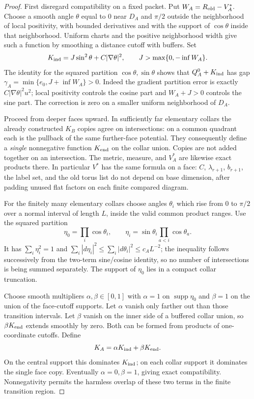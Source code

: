 \documentclass[11pt]{article}
\numberwithin{equation}{section}
\theoremstyle{definition}
\theoremstyle{remark}
\begin{document}
\begin{proof}
First disregard compatibility on a fixed packet.  Put
$W_A=R_{\rm old}-V_A^*$.  Choose a smooth angle $\theta$ equal to
$0$ near $D_A$ and $\pi/2$ outside the neighborhood of local positivity,
with bounded derivatives and with the support of $\cos\theta$ inside
that neighborhood.  Uniform charts and the positive neighborhood
width give such a function by smoothing a distance cutoff with
buffers.  Set
\[
 K_{\rm ind}=J\sin^2\theta+C|\nabla\theta|^2,
 \qquad J>\max\{0,-\inf W_A\}.
\]
The identity for the squared partition $\cos\theta,\sin\theta$
shows that $Q_A^0+K_{\rm ind}$ has gap
$\gamma_A=\min\{e_0,J+\inf W_A\}>0$.  Indeed the gradient
partition error is exactly $C|\nabla\theta|^2u^2$; local positivity
controls the cosine part and $W_A+J>0$ controls the sine part.
The correction is zero on a smaller uniform neighborhood of $D_A$.

Proceed from deeper faces upward.  In sufficiently far elementary
collars the already constructed $K_B$ copies agree on intersections:
on a common quadrant each is the pullback of the same further-face
potential.  They consequently define a \emph{single} nonnegative
function $K_{\rm end}$ on the collar union.  Copies are not added
together on an intersection.  The metric, measure, and $V_A^*$ are
likewise exact products there.  In particular $V^*$ has the same
formula on a face: $C$, $\lambda_{r+1}$, $b_{r+1}$, the label set,
and the old torus list do not depend on base dimension, after padding
unused flat factors on each finite compared diagram.

For the finitely many elementary collars choose angles $\theta_i$
which rise from $0$ to $\pi/2$ over a normal interval of length $L$,
inside the valid common product ranges.  Use the squared partition
\[
 \eta_0=\prod_i\cos\theta_i,\qquad
 \eta_i=\sin\theta_i\prod_{a<i}\cos\theta_a.
\]
It has $\sum_i\eta_i^2=1$ and
$\sum_i|d\eta_i|^2\le\sum_i|d\theta_i|^2\le c_A L^{-2}$;
the inequality follows successively from the two-term sine/cosine
identity, so no number of intersections is being summed separately.
The support of $\eta_0$ lies in a compact collar truncation.

Choose smooth multipliers $\alpha,\beta\in[0,1]$ with $\alpha=1$
on $\operatorname{supp}\eta_0$ and $\beta=1$ on the union of the face-cutoff
supports.  Let $\alpha$ vanish only farther out than those transition
intervals.  Let $\beta$ vanish on the inner side of a buffered collar
union, so $\beta K_{\rm end}$ extends smoothly by zero.  Both can be
formed from products of one-coordinate cutoffs.  Define
\[
 K_A=\alpha K_{\rm ind}+\beta K_{\rm end}.
\]
On the central support this dominates $K_{\rm ind}$; on each collar
support it dominates the single face copy.  Eventually
$\alpha=0,\beta=1$, giving exact compatibility.  Nonnegativity permits
the harmless overlap of these two terms in the finite transition
region.


\end{proof}
\end{document}
